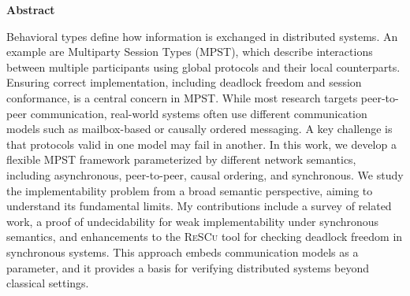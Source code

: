 \documentclass{article}
\theoremstyle{definition}
\theoremstyle{definition}
\theoremstyle{definition}
\begin{document}
\begin{center}
    \Large{\textbf{Abstract}}
\end{center}
Behavioral types define how information is exchanged in distributed systems.
An example are Multiparty Session Types (MPST), which describe interactions between multiple participants
using global protocols and their local counterparts. Ensuring correct implementation,
including deadlock freedom and session conformance, is a central concern in MPST.
While most research targets peer-to-peer communication, real-world systems often
use different communication models such as mailbox-based or causally ordered messaging.
A key challenge is that protocols valid in one model may fail in another.
In this work, we develop a flexible MPST framework parameterized by different network
semantics, including asynchronous, peer-to-peer, causal ordering, and synchronous.
We study the implementability problem from a broad semantic perspective, aiming to
understand its fundamental limits. My contributions include a survey
of related work, a proof of undecidability for weak implementability under synchronous
semantics, and enhancements to the \textsc{ReSCu} tool for checking deadlock freedom in
synchronous systems. This approach embeds communication models as a parameter, and it
provides a basis for verifying distributed systems beyond classical settings.

\newpage

\tableofcontents

\newpage













\newpage

{}



\newpage


\end{document}
